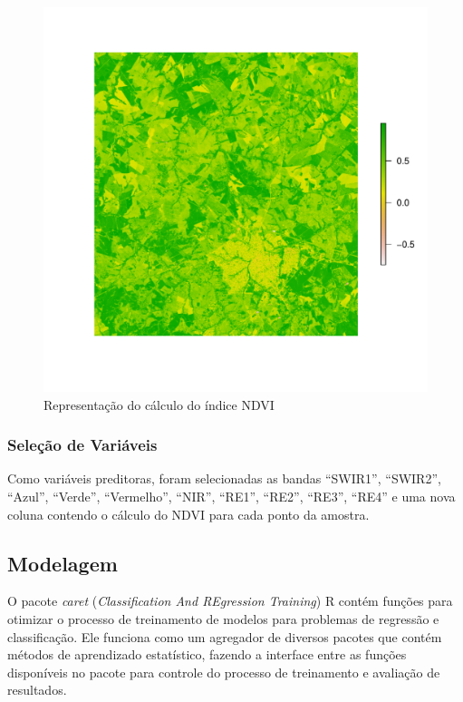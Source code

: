 \begin{figure}[H]
    \centering
    \caption{Representação do cálculo do índice NDVI} \label{fig-fluxograma}
    \includegraphics[scale=0.7]{figs/plot_ndvi.pdf}
\end{figure}

\subsubsection{Seleção de Variáveis}\label{selecao-de-variaveis}

	Como variáveis preditoras, foram selecionadas as bandas ``SWIR1'',
``SWIR2'', ``Azul'', ``Verde'', ``Vermelho'', ``NIR'', ``RE1'', ``RE2'',
``RE3'', ``RE4'' e uma nova coluna contendo o cálculo do NDVI para cada
ponto da amostra.


\subsection{Modelagem}\label{modelagem}

	O pacote \emph{caret} (\emph{Classification And REgression Training}) \cite{caret} R contém funções para otimizar o processo de treinamento de modelos para problemas de regressão e classificação. Ele funciona como um agregador de diversos pacotes que contém métodos de aprendizado estatístico, fazendo a interface entre as funções disponíveis no pacote para controle do processo de treinamento e avaliação de resultados.

